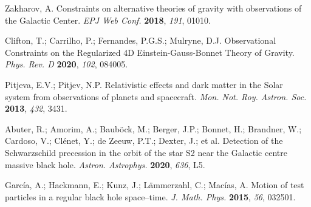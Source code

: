 \documentclass[aps,amsmath,amssymb,twocolumn]{revtex4}
\begin{document}
\begin{thebibliography}{999}
Zakharov, A.  
Constraints on alternative theories of gravity with observations of the Galactic Center.
\emph{EPJ Web Conf.} \textbf{2018}, \emph{191}, 01010.




 Clifton, T.; Carrilho, P.; Fernandes, P.G.S.; Mulryne, D.J. 
  Observational Constraints on the Regularized 4D Einstein-Gauss-Bonnet Theory of Gravity.
  \emph{Phys. Rev. D} \textbf{2020}, {\em 102},  084005.

 Pitjeva, E.V.; Pitjev, N.P. 
  Relativistic effects and dark matter in the Solar system from observations of planets and spacecraft.
  \emph{Mon. Not. Roy. Astron. Soc.}  \textbf{2013}, {\em 432}, 3431.

 Abuter, R.; Amorim, A.; Baub\"{o}ck, M.; Berger, J.P.; Bonnet, H.; Brandner, W.; Cardoso, V.; Cl\'enet, Y.; de Zeeuw, P.T.; Dexter, J.; {et al.} %
Detection of the Schwarzschild precession in the orbit of the star S2 near the Galactic centre massive black hole.
\emph{Astron. Astrophys.} \textbf{2020}, \emph{636}, L5.


 Garc{\'i}a, A.; Hackmann, E.; Kunz, J.; L{\"a}mmerzahl, C.; Mac{\'i}as, A. 
  Motion of test particles in a regular black hole space–time.
  \emph{J. Math. Phys.}  \textbf{2015}, {\em 56}, 032501.


\end{thebibliography}
\end{document}

